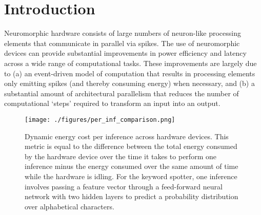 \documentclass[sigconf, screen]{acmart}
\begin{document}


%

\maketitle

\section{Introduction}

Neuromorphic hardware consists of large numbers of neuron-like processing elements that communicate in parallel via spikes. The use of neuromorphic devices can provide substantial improvements in power efficiency and latency across a wide range of computational tasks. These improvements are largely due to (a) an event-driven model of computation that results in processing elements only emitting spikes (and thereby consuming energy) when necessary, and (b) a substantial amount of architectural parallelism that reduces the number of computational `steps' required to transform an input into an output. 

\begin{figure}[!b]
\centering
    \texttt{[image: ./figures/per\_inf\_comparison.png]}
    \caption{Dynamic energy cost per inference across hardware devices. This metric is equal to the difference between the total energy consumed by the hardware device over the time it takes to perform one inference minus the energy consumed over the same amount of time while the hardware is idling. For the keyword spotter, one inference involves passing a feature vector through a feed-forward neural network with two hidden layers to predict a probability distribution over alphabetical characters.}
\label{per_inf_fig}
\end{figure}
\end{document}
